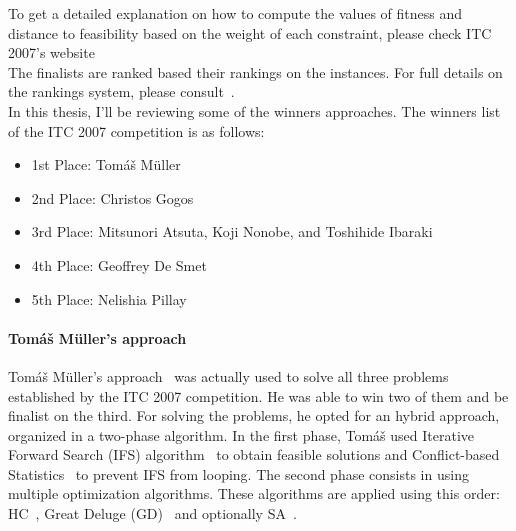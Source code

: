To get a detailed explanation on how to compute the values of fitness and distance to feasibility based on the weight of each constraint, please check ITC 2007's website~\cite{McCollum2008}\\

The finalists are ranked based their rankings on the instances. For full details on the rankings system, please consult~\cite{BarryMcCollum2008}.\\

In this thesis, I'll be reviewing some of the winners approaches. The winners list of the ITC 2007 competition is as follows:
\begin{itemize}
	\item 1st Place: Tom\'{a}\v{s} M\"{u}ller
	\item 2nd Place: Christos Gogos
	\item 3rd Place: Mitsunori Atsuta, Koji Nonobe, and Toshihide Ibaraki
	\item 4th Place: Geoffrey De Smet
	\item 5th Place: Nelishia Pillay
\end{itemize}

\paragraph{Tom\'{a}\v{s} M\"{u}ller's approach}

Tom\'{a}\v{s} M\"{u}ller's approach~\cite{Mueller2009} was actually used to solve all three problems established by the ITC 2007 competition. He was able to win two of them and be finalist on the third. For solving the problems, he opted for an hybrid approach, organized in a two-phase algorithm. In the first phase, Tom\'{a}\v{s} used Iterative Forward Search (IFS) algorithm~\cite{Mueller2005} to obtain feasible solutions and Conflict-based Statistics~\cite{Rudova2004} to prevent IFS from looping. 
The second phase consists in using multiple optimization algorithms. These algorithms are applied using this order: HC~\cite{Russell2010}, Great Deluge (GD)~\cite{Dueck1993} and optionally SA~\cite{Kirkpatrick1983}.\\

